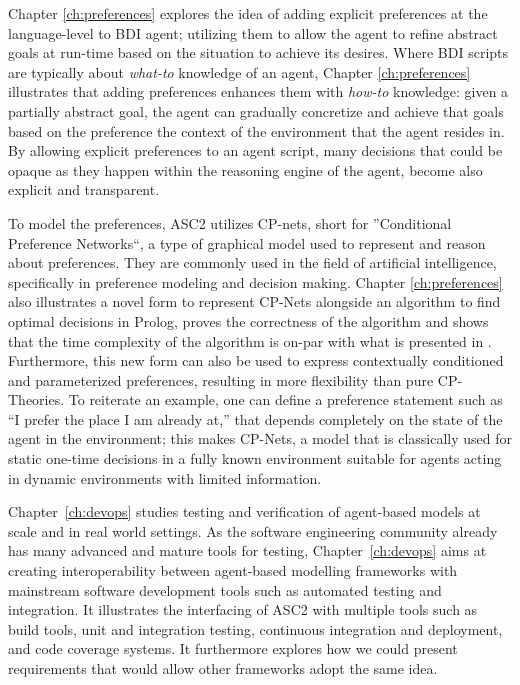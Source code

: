 Chapter \ref{ch:preferences} explores the idea of adding explicit preferences at the language-level to BDI agent; utilizing them to allow the agent to refine abstract goals at run-time based on the situation to achieve its desires. Where BDI scripts are typically about \textit{what-to} knowledge of an agent, Chapter \ref{ch:preferences} illustrates that adding preferences enhances them with \textit{how-to} knowledge: given a partially abstract goal, the agent can gradually concretize and achieve that goals based on the preference the context of the environment that the agent resides in. By allowing explicit preferences to an agent script, many decisions that could be opaque as they happen within the reasoning engine of the agent, become also explicit and transparent. 

To model the preferences, ASC2 utilizes CP-nets, short for ''Conditional Preference Networks``, a type of graphical model used to represent and reason about preferences. They are commonly used in the field of artificial intelligence, specifically in preference modeling and decision making. Chapter \ref{ch:preferences} also illustrates a novel form to represent CP-Nets alongside an algorithm to find optimal decisions in Prolog, proves the correctness of the algorithm and shows that the time complexity of the algorithm is on-par with what is presented in \cite{Boutilier2004}. Furthermore, this new form can also be used to express contextually conditioned and parameterized preferences, resulting in more flexibility than pure CP-Theories. To reiterate an example, one can define a preference statement such as ``I prefer the place I am already at,'' that depends completely on the state of the agent in the environment; this makes CP-Nets, a model that is classically used for static one-time decisions in a fully known environment suitable for agents acting in dynamic environments with limited information.


Chapter~\ref{ch:devops} studies testing and verification of agent-based models at scale and in real world settings. As the software engineering community already has many advanced and mature tools for testing, Chapter~\ref{ch:devops} aims at creating interoperability between agent-based modelling frameworks with mainstream software development tools such as automated testing and integration. It illustrates the interfacing of ASC2 with multiple tools such as build tools, unit and integration testing,  continuous integration and deployment, and code coverage systems. It furthermore explores how we could present requirements that would allow other frameworks adopt the same idea.

